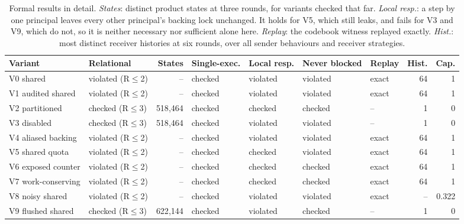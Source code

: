 \begin{table}[!ht]
\centering\footnotesize
\caption{Formal results in detail. \emph{States}: distinct product states at three rounds, for variants checked that far. \emph{Local resp.}: a step by one principal leaves every other principal's backing lock unchanged. It holds for V5, which still leaks, and fails for V3 and V9, which do not, so it is neither necessary nor sufficient alone here. \emph{Replay}: the codebook witness replayed exactly. \emph{Hist.}: most distinct receiver histories at six rounds, over all sender behaviours and receiver strategies.}
\label{tab:formal}
\setlength{\tabcolsep}{3pt}
\begin{tabular}{@{}l l r l l l l r r@{}}
\toprule
\textbf{Variant} & \textbf{Relational} & \textbf{States} & \textbf{Single-exec.} & \textbf{Local resp.} & \textbf{Never blocked} & \textbf{Replay} & \textbf{Hist.} & \textbf{Cap.}\\
\midrule
V0 shared & violated (R$\leq$2) & -- & checked & violated & violated & exact & 64 & 1 \\
V1 audited shared & violated (R$\leq$2) & -- & checked & violated & violated & exact & 64 & 1 \\
V2 partitioned & checked (R$\leq$3) & 518{,}464 & checked & checked & checked & -- & 1 & 0 \\
V3 disabled & checked (R$\leq$3) & 518{,}464 & checked & violated & violated & -- & 1 & 0 \\
V4 aliased backing & violated (R$\leq$2) & -- & checked & violated & violated & exact & 64 & 1 \\
V5 shared quota & violated (R$\leq$2) & -- & checked & checked & violated & exact & 64 & 1 \\
V6 exposed counter & violated (R$\leq$2) & -- & checked & checked & checked & exact & 64 & 1 \\
V7 work-conserving & violated (R$\leq$2) & -- & checked & checked & checked & exact & 64 & 1 \\
V8 noisy shared & violated (R$\leq$2) & -- & checked & violated & violated & exact & -- & 0.322 \\
V9 flushed shared & checked (R$\leq$3) & 622{,}144 & checked & violated & checked & -- & 1 & 0 \\
\bottomrule
\end{tabular}
\end{table}
